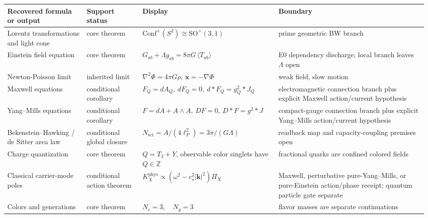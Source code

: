 \documentclass[11pt]{article}
\begin{document}
\begingroup
\footnotesize
\begin{longtable}{@{}>{\raggedright\arraybackslash}p{}>{\raggedright\arraybackslash}p{}>{\raggedright\arraybackslash}p{}>{\raggedright\arraybackslash}p{}@{}}
\toprule
Recovered formula or output & Support status & Display & Boundary \\
\midrule
\endhead
\bottomrule
\endfoot
Lorentz transformations and light cone & core theorem & \(\mathrm{Conf}^+(S^2)\cong\mathrm{SO}^+(3,1)\) & prime geometric BW branch \\
Einstein field equation & core theorem & \(G_{ab}+\Lambda g_{ab}=8\pi G\,\langle T_{ab}\rangle\) & E0 dependency discharge; local branch leaves \(\Lambda\) open \\
Newton-Poisson limit & inherited limit & \(\nabla^2\Phi=4\pi G\rho\), \(\ddot{\mathbf x}=-\nabla\Phi\) & weak field, slow motion \\
Maxwell equations & conditional corollary & \(F_Q=dA_Q,\ dF_Q=0,\ d{*}F_Q=g_Q^2{*}J_Q\) & electromagnetic connection branch plus explicit Maxwell action/current hypothesis \\
Yang--Mills equations & conditional corollary & \(F=dA+A\wedge A,\ DF=0,\ D{*}F=g^2{*}J\) & compact-gauge connection branch plus explicit Yang--Mills action/current hypothesis \\
Bekenstein--Hawking / de Sitter area law & conditional global closure & \(N_{\mathrm{scr}}=A/(4\ell_P^2)=3\pi/(G\Lambda)\) & readback map and capacity-coupling premises open \\
Charge quantization & core theorem & \(Q=T_3+Y\), observable color singlets have \(Q\in\mathbb Z\) & fractional quarks are confined colored fields \\
Classical carrier-mode poles & conditional action theorem & \(K_X^{\mathrm{phys}}\propto(\omega^2-c_\star^2|\mathbf k|^2)\Pi_X\) & Maxwell, perturbative pure-Yang--Mills, or pure-Einstein action/phase receipt; quantum particle gate separate \\
Colors and generations & core theorem & \(N_c=3,\quad N_g=3\) & flavor masses are separate continuations \\
\end{longtable}
\endgroup
\end{document}
